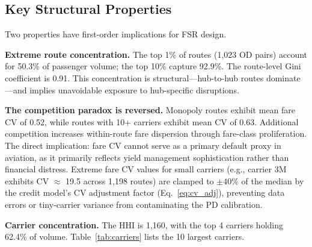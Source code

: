 \documentclass[12pt,a4paper]{article}
\begin{document}
\subsection{Key Structural Properties}

Two properties have first-order implications for FSR design.

\textbf{Extreme route concentration.} The top 1\% of routes (1,023 OD pairs) account for 50.3\% of passenger volume; the top 10\% capture 92.9\%. The route-level Gini coefficient is 0.91. This concentration is structural---hub-to-hub routes dominate---and implies unavoidable exposure to hub-specific disruptions.

\textbf{The competition paradox is reversed.} Monopoly routes exhibit mean fare CV of 0.52, while routes with 10+ carriers exhibit mean CV of 0.63. Additional competition increases within-route fare dispersion through fare-class proliferation. The direct implication: fare CV cannot serve as a primary default proxy in aviation, as it primarily reflects yield management sophistication rather than financial distress. Extreme fare CV values for small carriers (e.g., carrier 3M exhibits CV $\approx$ 19.5 across 1,198 routes) are clamped to $\pm 40\%$ of the median by the credit model's CV adjustment factor (Eq.~\ref{eq:cv_adj}), preventing data errors or tiny-carrier variance from contaminating the PD calibration.

\textbf{Carrier concentration.} The HHI is 1,160, with the top 4 carriers holding 62.4\% of volume. Table~\ref{tab:carriers} lists the 10 largest carriers.
\end{document}
